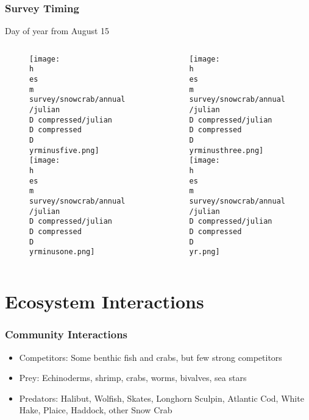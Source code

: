 \documentclass{beamer}
\numberwithin{equation}{section}		%
\numberwithin{figure}{section}	   	%
\numberwithin{table}{section}				%
\newcommand{\yr}{2017}
\newcommand{\yrminusone}{2016}
\newcommand{\yrminusthree}{2014}
\newcommand{\yrminusfive}{2012}
\newcommand{\D}{.}  %
\newcommand{\h}{C:/} %
\newcommand{\es}{bio.data/bio.snowcrab/} %
\newcommand{\m}{output/maps/} %
\begin{document}
\begin{frame}
\frametitle{Survey Timing}
 \vspace*{0.4cm}
Day of year from August 15
 \vspace*{-0.65cm}
\begin{columns}[T]
	\begin{column}{0.5\textwidth}
		\begin{figure}
			\texttt{[image: \\h \\es \\m survey/snowcrab/annual/julian\\D compressed/julian\\D compressed\\D \\yrminusfive.png]}\\   
			\texttt{[image: \\h \\es \\m survey/snowcrab/annual/julian\\D compressed/julian\\D compressed\\D \\yrminusone.png]}\\   
		\end{figure}
	\end{column}
	
	\begin{column}{0.5\textwidth}
		\begin{centering}
			\begin{figure}
				\texttt{[image: \\h \\es \\m survey/snowcrab/annual/julian\\D compressed/julian\\D compressed\\D \\yrminusthree.png]}\\   
				\texttt{[image: \\h \\es \\m survey/snowcrab/annual/julian\\D compressed/julian\\D compressed\\D \\yr.png]}\\   
			\end{figure}
		\end{centering}
	\end{column}
\end{columns}

\end{frame}




\section{Ecosystem Interactions}
\begin{frame}
\frametitle{Community Interactions}

\begin{itemize}
	\setlength\itemsep{2em}
	\item Competitors: Some benthic fish and crabs, but few strong competitors
	\item Prey: Echinoderms, shrimp, crabs, worms, bivalves, sea stars
	\item Predators: Halibut, Wolfish, Skates, Longhorn Sculpin, Atlantic Cod, White Hake, Plaice, Haddock, other Snow Crab
\end{itemize}
\end{frame}
\end{document}
